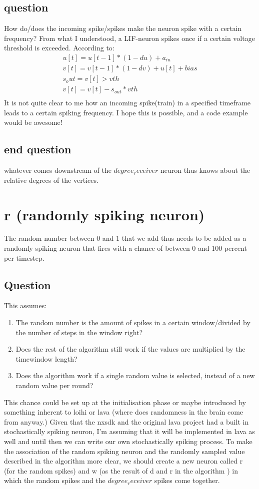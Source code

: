 \subsection{question}
How do/does the incoming spike/spikes make the neuron spike with a certain frequency? From what I understood, a LIF-neuron spikes once if a certain voltage threshold is exceeded. According to:
\begin{equation}
    \begin{split}
    u[t] = u[t-1] * (1-du) + a_{in} \\
    v[t] = v[t-1] * (1-dv) + u[t] + bias \\
    s_out = v[t] > vth \\
    v[t] = v[t] - s_{out}*vth \\
    \end{split}
\end{equation}
It is not quite clear to me how an incoming spike(train) in a specified timeframe leads to a certain spiking frequency. I hope this is possible, and a code example would be awesome!
\subsection{end question}
whatever comes downstream of the $degree_receiver$ neuron thus knows about the relative degrees of the
vertices.


\section{r (randomly spiking neuron)}\label{sec:random}
The random number between 0 and 1 that we add thus needs to be added as a
randomly spiking neuron that fires with a chance of between 0 and 100 percent
per timestep. 
\subsection{Question}
This assumes:
\begin{enumerate}
    \item The random number is the amount of spikes in a certain window/divided by the number of steps in the window right?
    \item Does the rest of the algorithm still work if the values are multiplied by the timewindow length?
    \item Does the algorithm work if a single random value is selected, instead of a new random value per round?
\end{enumerate}
This chance could be set up at the initialisation phase or maybe
introduced by something inherent to loihi or lava (where does randomness in
the brain come from anyway.) Given that the nxsdk and the original lava project
had a built in stochastically spiking neuron, I'm assuming that it will be
implemented in lava as well and until then we can write our own stochastically
spiking process. To make the association of the random spiking neuron and the
randomly sampled value described in the algorithm more clear, we should
create a new neuron called r (for the random spikes) and w (as the result of d
and r in the algorithm ) in which the random spikes and the $degree_receiver$
spikes come together.


